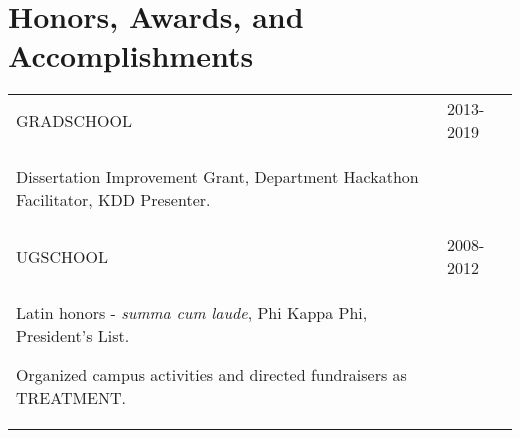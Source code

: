 \documentclass[a4paper,10pt]{article}
\begin{document}
\section{Honors, Awards, and Accomplishments}
\begin{supertabular}{p{13.9cm}>{\raggedleft\arraybackslash}p{3.4cm}}

	\textsc{GRADSCHOOL}
	& \textsc{2013-2019} \\
	\begin{enumerate*}[label =$\circ$, itemjoin={\newline}]
		\item \footnotesize Dissertation Improvement Grant, Department Hackathon Facilitator, KDD Presenter.
	\end{enumerate*} \vspace{2mm} & \\

	\textsc{UGSCHOOL}
	& \textsc{2008-2012} \\
	\begin{enumerate*}[label =$\circ$, itemjoin={\newline}]
		\item \footnotesize  Latin honors - \emph{summa cum laude}, Phi Kappa Phi, President's List.
		\item \footnotesize  Organized campus activities and directed fundraisers as TREATMENT.
	\end{enumerate*} \vspace{0mm} & \\



\end{supertabular}




\end{document}
